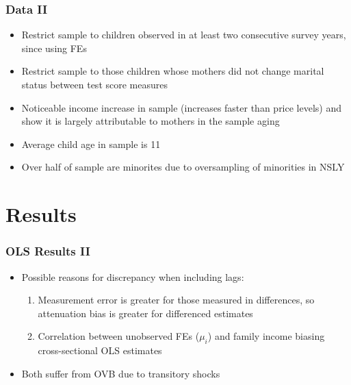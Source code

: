 \documentclass{beamer}
\begin{document}
\begin{frame}
\frametitle{Data II}
\begin{itemize}
	\item Restrict sample to children observed in at least two consecutive survey years, since using FEs
	\item Restrict sample to those children whose mothers did not change marital status between test score measures
	\item Noticeable income increase in sample (increases faster than price levels) and show it is largely attributable to mothers in the sample aging
	\item Average child age in sample is 11
	\item Over half of sample are minorites due to oversampling of minorities in NSLY
\end{itemize}
\end{frame}


\section{Results}

\begin{frame}
\frametitle{OLS Results II}
	\begin{itemize}
		\item Possible reasons for discrepancy when including lags:
		\begin{enumerate}[(1)]
			\item Measurement error is greater for those measured in differences, so attenuation bias is greater for differenced estimates
			\item Correlation between unobserved FEs ($\mu_i$) and family income biasing cross-sectional OLS estimates 
		\end{enumerate}
		\item Both suffer from OVB due to transitory shocks
	\end{itemize}
\end{frame}
\end{document}
